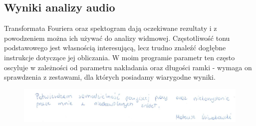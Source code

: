 \documentclass{article}
\begin{document}
\subsection{Wyniki analizy audio}
Transformata Fouriera oraz spektogram dają oczekiwane rezultaty i z powodzeniem można ich używać do analizy widmowej. Częstotliwość tonu podstawowego jest własnością interesującą, lecz trudno znaleźć dogłębne instrukcje dotyczące jej obliczania. W moim programie parametr ten często oscyluje w zależności od parametru nakładania oraz długości ramki - wymaga on sprawdzenia z zestawami, dla których posiadamy wiarygodne wyniki.

\begin{figure}[b]
\centering
\includegraphics[width=5in]{bottom.png}
\end{figure}
\end{document}
